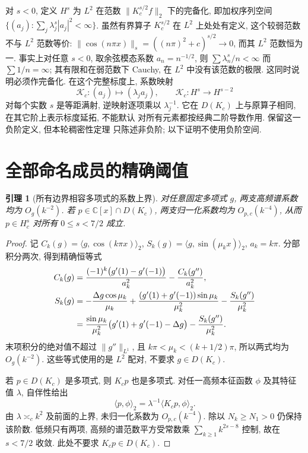 \documentclass[UTF8]{ctexart}
\newtheorem{lemma}[theorem]{引理}
\begin{document}
对 $s<0$, 定义 $H^s$ 为 $L^2$ 在范数 $\|K_c^{s/2}f\|_2$ 下的完备化,
即加权序列空间 $\{(a_j):\sum_j\lambda_j^s|a_j|^2<\infty\}$.
虽然有界算子 $K_c^{s/2}$ 在 $L^2$ 上处处有定义, 这个较弱范数不与
$L^2$ 范数等价: $\|\cos(n\pi x)\|_s=((n\pi)^2+c)^{s/2}\to0$,
而其 $L^2$ 范数恒为一. 事实上对任意 $s<0$, 取余弦模态系数
$a_n=n^{-1/2}$, 则 $\sum\lambda_n^s/n<\infty$ 而 $\sum1/n=\infty$;
其有限和在弱范数下 Cauchy, 在 $L^2$ 中没有该范数的极限.
这同时说明必须作完备化. 在这个完整标度上, 系数映射
\[
 \mathcal K_c:(a_j)\longmapsto(\lambda_ja_j),\qquad
 \mathcal K_c:H^s\longrightarrow H^{s-2}
\]
对每个实数 $s$ 是等距满射, 逆映射逐项乘以 $\lambda_j^{-1}$.
它在 $D(K_c)$ 上与原算子相同, 在其它阶上表示标度延拓, 不能默认
对所有元素都按经典二阶导数作用. 保留这一负阶定义, 但本轮稠密性定理
只陈述非负阶; 以下证明不使用负阶空间.

\section{全部命名成员的精确阈值}
\begin{lemma}[所有边界相容多项式的系数上界]\label{lem:coefficient-upper}
对任意固定多项式 $g$, 两支高频谱系数均为 $O_g(k^{-2})$.
若 $p\in\mathbb C[x]\cap D(K_c)$, 两支归一化系数均为 $O_{p,c}(k^{-4})$,
从而 $p\in H_c^s$ 对所有 $0\le s<7/2$ 成立.
\end{lemma}
\begin{proof}
记 $C_k(g)=\langle g,\cos(k\pi x)\rangle_2$,
$S_k(g)=\langle g,\sin(\mu_kx)\rangle_2$, $a_k=k\pi$.
分部积分两次, 得到精确恒等式
\begin{align}
 C_k(g)&=\frac{(-1)^k\bigl(g'(1)-g'(-1)\bigr)}{a_k^2}
          -\frac{C_k(g'')}{a_k^2},\label{eq:cos-ibp}\\
 S_k(g)&=-\frac{\Delta g\cos\mu_k}{\mu_k}
 +\frac{(g'(1)+g'(-1))\sin\mu_k}{\mu_k^2}
 -\frac{S_k(g'')}{\mu_k^2}\notag\\
 &=\frac{\sin\mu_k}{\mu_k^2}
 \bigl(g'(1)+g'(-1)-\Delta g\bigr)-\frac{S_k(g'')}{\mu_k^2}.
 \label{eq:sin-ibp}
\end{align}
末项积分的绝对值不超过 $\|g''\|_{L^1}$, 且
$k\pi<\mu_k<(k+1/2)\pi$, 所以两式均为 $O_g(k^{-2})$.
这些等式使用的是 $L^2$ 配对, 不要求 $g\in D(K_c)$.

若 $p\in D(K_c)$ 是多项式, 则 $K_cp$ 也是多项式.
对任一高频本征函数 $\phi$ 及其特征值 $\lambda$,
自伴性给出
\[
 \langle p,\phi\rangle_2=\lambda^{-1}\langle K_cp,\phi\rangle_2.
\]
由 $\lambda\asymp_c k^2$ 及前面的上界, 未归一化系数为 $O_{p,c}(k^{-4})$.
除以 $N_k\ge N_1>0$ 仍保持该阶数. 低频只有两项,
高频的谱范数平方受常数乘 $\sum_{k\ge1}k^{2s-8}$ 控制,
故在 $s<7/2$ 收敛. 此处不要求 $K_cp\in D(K_c)$.
\end{proof}
\end{document}
